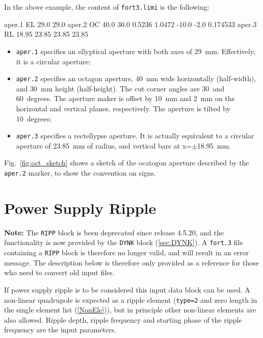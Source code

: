 In the above example, the content of \texttt{fort3.limi} is the following:
\begin{cverbatim}
aper.1        EL     29.0      29.0            
aper.2        OC     40.0      30.0       0.5236    1.0472       -10.0       -2.0        0.174533
aper.3        RL     18.95     23.85      23.85      23.85  
\end{cverbatim}
\begin{itemize}
\item \texttt{aper.1} specifies an ellyptical aperture with both axes of 29~mm. Effectively, it is a circular aperture;
\item \texttt{aper.2} specifies an octagon aperture, 40~mm wide horizontally (half-width), and 30~mm height (half-height).
  The cut corner angles are 30~and 60~degrees. The aperture maker is offset by 10~mm and 2~mm on the horizontal and vertical
  planes, respectively. The aperture is tilted by 10~degrees;
\item \texttt{aper.3} specifies a rectellypse aperture. It is actually equivalent to a circular aperture of 23.85~mm of radius,
  and vertical bars at x=$\pm$18.95~mm.
\end{itemize}
Fig.~\ref{fig:oct_sketch} shows a sketch of the ocatogon aperture described by the \texttt{aper.2} marker, to show the convention on signs.

\section{Power Supply Ripple} \label{PowRip}

\textcolor{notered}{\textbf{Note:}
The \texttt{RIPP} block is been deprecated since release 4.5.20, and the functionality is now provided by the \texttt{DYNK} block (\ref{sec:DYNK}).
A \texttt{fort.3} file containing a \texttt{RIPP} block is therefore no longer valid, and will result in an error message.
The description below is therefore only provided as a reference for those who need to convert old input files.}

\bigskip
\noindent If power supply ripple is to be considered this input data block can be used. A non-linear quadrupole is expected as a ripple element (\texttt{type=2} and zero length in the single element list (\ref{NonEle})), but in principle other non-linear elements are also allowed.
Ripple depth, ripple frequency and starting phase of the ripple frequency are the input parameters.

